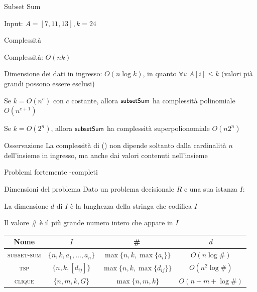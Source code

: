 \begin{frame}{Subset Sum}

Input: $A = [7, 11, 13], k=24$

\bigskip
{}

\end{frame}

\begin{frame}{Complessità}

\BIL
\item Complessità: $O(nk)$
\item Dimensione dei dati in ingresso: $O(n \log k)$, in quanto $\forall i: A[i] \leq k$ (valori pià grandi possono essere esclusi)
\item Se $k = O(n^c)$ con $c$ costante, allora $\textsf{{\small subsetSum}}$ ha complessità
polinomiale $O(n^{c+1})$
\item Se $k = O(2^n)$, allora $\textsf{{\small subsetSum}}$ ha complessità superpolionomiale
$O(n2^n)$
\EIL

\begin{block}{Osservazione}
La complessità di \subsetsum() non dipende soltanto dalla 
cardinalità $n$ dell'insieme in ingresso, ma anche dai valori contenuti
nell'insieme
\end{block}

\end{frame}

\begin{frame}{Problemi fortemente \NP-completi}

\vspace{-9pt}
\begin{block}{Dimensioni del problema}
Dato un problema decisionale $R$ e una sua istanza $I$:
\BIL
\item La \alert{dimensione $d$} di $I$ è la lunghezza della stringa che codifica $I$
\item Il \alert{valore \#} è il più grande numero intero che appare in $I$
\EIL
\end{block}

\bigskip
{}
\medskip
\small
\begin{tabular}{|c|c|c|c|}
\hline
\textbf{Nome} & $I$ & \# & $d$ \\\hline
\textsc{subset-sum} & $ \{n, k, a_1, \ldots, a_n\}$ & $\max\{n, k, \max \{ a_i \}\}$ & $O(n \log \#)$ \\\hline
\textsc{tsp} & $\{n, k, [d_{ij}]\}$ & $\max\{n, k, \max \{ d_{ij} \}\}$ &
$O(n^2 \log \#)$ \\\hline
\textsc{clique} & $\{n, m, k, G \}$ & $\max\{n, m, k\}$ & $O(n + m+ \log\#)$\\\hline
\end{tabular}

\end{frame}

